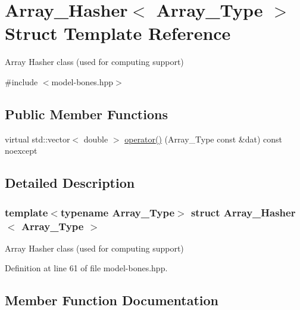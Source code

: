 \hypertarget{struct_array___hasher}{}\section{Array\+\_\+\+Hasher$<$ Array\+\_\+\+Type $>$ Struct Template Reference}
\label{struct_array___hasher}


Array Hasher class (used for computing support)  




{\ttfamily \#include $<$model-\/bones.\+hpp$>$}

\subsection*{Public Member Functions}
\begin{DoxyCompactItemize}
\item 
virtual std\+::vector$<$ double $>$ \hyperlink{struct_array___hasher_a096dc8674477127f45a54ff4dc4038b0}{operator()} (Array\+\_\+\+Type const \&dat) const noexcept
\end{DoxyCompactItemize}


\subsection{Detailed Description}
\subsubsection*{template$<$typename Array\+\_\+\+Type$>$\newline
struct Array\+\_\+\+Hasher$<$ Array\+\_\+\+Type $>$}

Array Hasher class (used for computing support) 



Definition at line 61 of file model-\/bones.\+hpp.



\subsection{Member Function Documentation}
\mbox{\label{struct_array___hasher_a096dc8674477127f45a54ff4dc4038b0}} 
